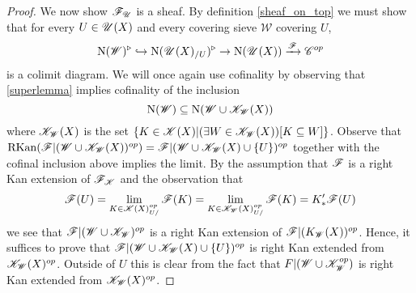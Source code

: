 \documentclass[../thesis.tex]{subfiles}
\begin{document}
\begin{proof}
    We now show $\mathscr{F}_{\mathscr{U}}$ is a sheaf.
    By definition \ref{sheaf_on_top} we must show that for every $U\in \mathscr{U}(X)$ and every covering sieve $\mathscr{W}$ covering $U$,
    \[
        \mathrm{N}(\mathscr{W})^{\triangleright} \hookrightarrow \mathrm{N}(\mathscr{U}(X)_{/U})^{\triangleright} \rightarrow \mathrm{N}(\mathscr{U}(X))\xrightarrow{\mathscr{F}}\mathscr{C}^{op}
    \]
    is a colimit diagram.
    We will once again use cofinality by observing that \ref{superlemma} implies cofinality of the inclusion
    \[
        \mathrm{N}(\mathscr{W}) \subseteq \mathrm{N}(\mathscr{W} \cup \mathscr{K}_{\mathscr{W}}(X))
    \]
    where $\mathscr{K}_{\mathscr{W}}(X)$ is the set $\{K\in \mathscr{K}(X) | (\exists W \in \mathscr{K}_{\mathscr{W}}(X))[K \subseteq W] \}$.
    Observe that $\mathrm{RKan}(\mathscr{F}|(\mathscr{W} \cup \mathscr{K}_{\mathscr{W}}(X))^{op}) = \mathscr{F}|(\mathscr{W} \cup \mathscr{K}_{\mathscr{W}}(X) \cup \{U\})^{op}$ together with the cofinal inclusion above implies the limit.
    By the assumption that $\mathscr{F}$ is a right Kan extension of $\mathscr{F}_{\mathscr{K}}$ and the observation that
    \[
        \mathscr{F}(U) = \lim_{K\in \mathscr{K}(X)^{op}_{U/}}\mathscr{F}(K) = \lim_{K\in \mathscr{K}_{\mathscr{W}}(X)^{op}_{U/}}\mathscr{F}(K) = K_*^{\prime}\mathscr{F}(U)
    \]
    we see that $\mathscr{F}|(\mathscr{W} \cup \mathscr{K}_{\mathscr{W}})^{op}$ is a right Kan extension of $\mathscr{F}|(K_{\mathscr{W}}(X))^{op}$.
    Hence, it suffices to prove that $\mathscr{F}|(\mathscr{W} \cup \mathscr{K}_{\mathscr{W}}(X)\cup \{U\})^{op}$ is right Kan extended from $\mathscr{K}_{\mathscr{W}}(X)^{op}$.
    Outside of $U$ this is clear from the fact that $F|(\mathscr{W} \cup \mathscr{K}_{\mathscr{W}}^{op})$ is right Kan extended from $\mathscr{K}_{\mathscr{W}}(X)^{op}$.

\end{proof}
\end{document}
